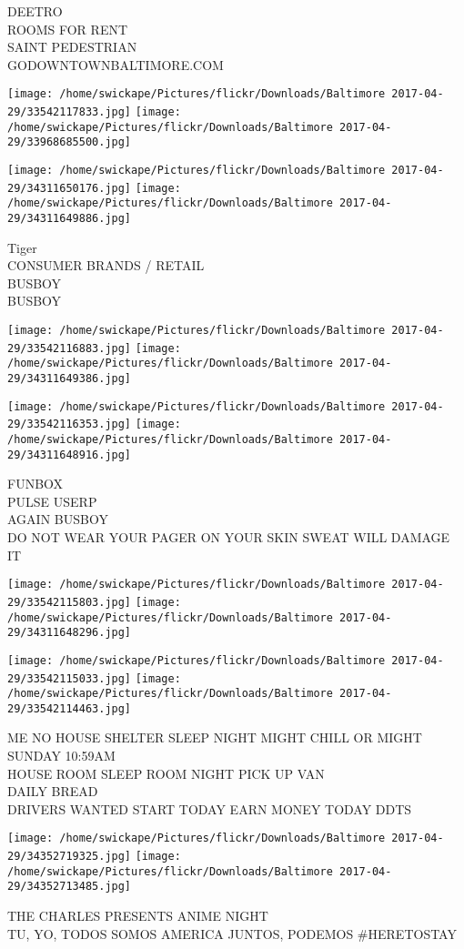 \documentclass[10pt,letterpaper]{article}
\begin{document}
DEETRO\\
ROOMS FOR RENT\\
SAINT PEDESTRIAN\\
GODOWNTOWNBALTIMORE.COM
\pagebreak

\texttt{[image: /home/swickape/Pictures/flickr/Downloads/Baltimore 2017-04-29/33542117833.jpg]}
\texttt{[image: /home/swickape/Pictures/flickr/Downloads/Baltimore 2017-04-29/33968685500.jpg]}

\texttt{[image: /home/swickape/Pictures/flickr/Downloads/Baltimore 2017-04-29/34311650176.jpg]}
\texttt{[image: /home/swickape/Pictures/flickr/Downloads/Baltimore 2017-04-29/34311649886.jpg]}

Tiger\\
CONSUMER BRANDS / RETAIL\\
BUSBOY\\
BUSBOY
\pagebreak

\texttt{[image: /home/swickape/Pictures/flickr/Downloads/Baltimore 2017-04-29/33542116883.jpg]}
\texttt{[image: /home/swickape/Pictures/flickr/Downloads/Baltimore 2017-04-29/34311649386.jpg]}

\texttt{[image: /home/swickape/Pictures/flickr/Downloads/Baltimore 2017-04-29/33542116353.jpg]}
\texttt{[image: /home/swickape/Pictures/flickr/Downloads/Baltimore 2017-04-29/34311648916.jpg]}

FUNBOX\\
PULSE USERP\\
AGAIN BUSBOY\\
DO NOT WEAR YOUR PAGER ON YOUR SKIN SWEAT WILL DAMAGE IT
\pagebreak

\texttt{[image: /home/swickape/Pictures/flickr/Downloads/Baltimore 2017-04-29/33542115803.jpg]}
\texttt{[image: /home/swickape/Pictures/flickr/Downloads/Baltimore 2017-04-29/34311648296.jpg]}

\texttt{[image: /home/swickape/Pictures/flickr/Downloads/Baltimore 2017-04-29/33542115033.jpg]}
\texttt{[image: /home/swickape/Pictures/flickr/Downloads/Baltimore 2017-04-29/33542114463.jpg]}

ME NO HOUSE SHELTER SLEEP NIGHT MIGHT CHILL OR MIGHT SUNDAY 10:59AM\\
HOUSE ROOM SLEEP ROOM NIGHT PICK UP VAN\\
DAILY BREAD\\
DRIVERS WANTED START TODAY EARN MONEY TODAY DDTS
\pagebreak

\texttt{[image: /home/swickape/Pictures/flickr/Downloads/Baltimore 2017-04-29/34352719325.jpg]}
\texttt{[image: /home/swickape/Pictures/flickr/Downloads/Baltimore 2017-04-29/34352713485.jpg]}

THE CHARLES PRESENTS ANIME NIGHT\\
TU, YO, TODOS SOMOS AMERICA JUNTOS, PODEMOS \#HERETOSTAY
\pagebreak
\end{document}
